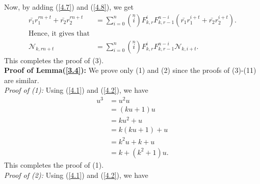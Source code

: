 Now, by adding (\ref{4.7}) and (\ref{4.8}), we get \\
\begin{align*}
\bar{r_{1}}r_1^{rn+t}+\bar{r_{2}}r_2^{rn+t}&=\sum\limits_{i=0}^{n}\left( \stackrel{n}{i}\right)F_{k,r}^iF_{k,r-1}^{n-i}(\bar{r_{1}}r_1^{i+t}+\bar{r_{2}}r_2^{i+t}).\\
\text{Hence, it gives that}\\
\mathcal{N}_{k,rn+t}&=\sum\limits_{i=0}^{n}\left( \stackrel{n}{i}\right)F_{k,r}^iF_{k,r-1}^{n-i}\mathcal{N}_{k,i+t}.
\end{align*}
This completes the proof of (3).\\
\textbf{Proof of Lemma(\ref{3.4}):} We prove only (1) and (2) since the proofs of (3)-(11) are similar.\\
\textit{Proof of (1):}
Using (\ref{4.1}) and (\ref{4.2}), we have
\begin{align*}
u^3&=u^2u\\
&=(ku+1)u\\
&=ku^2+u\\
&=k(ku+1)+u\\
&=k^2u+k+u\\
&=k+(k^2+1)u.
\end{align*}
This completes the proof of (1).\\
\textit{Proof of (2):}
Using (\ref{4.1}) and (\ref{4.2}), we have

